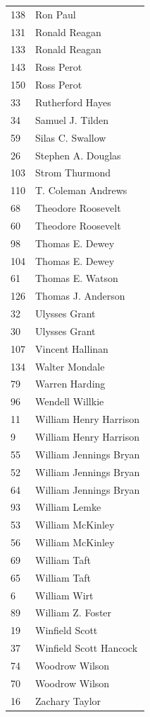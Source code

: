 \documentclass[
  letterpaper,
  DIV=11,
  numbers=noendperiod]{scrreprt}
\begin{document}
\begin{tabular}{ll}
138 &                Ron Paul \\
131 &           Ronald Reagan \\
133 &           Ronald Reagan \\
143 &              Ross Perot \\
150 &              Ross Perot \\
33  &        Rutherford Hayes \\
34  &        Samuel J. Tilden \\
59  &        Silas C. Swallow \\
26  &      Stephen A. Douglas \\
103 &          Strom Thurmond \\
110 &      T. Coleman Andrews \\
68  &      Theodore Roosevelt \\
60  &      Theodore Roosevelt \\
98  &         Thomas E. Dewey \\
104 &         Thomas E. Dewey \\
61  &        Thomas E. Watson \\
126 &      Thomas J. Anderson \\
32  &           Ulysses Grant \\
30  &           Ulysses Grant \\
107 &        Vincent Hallinan \\
134 &          Walter Mondale \\
79  &          Warren Harding \\
96  &         Wendell Willkie \\
11  &  William Henry Harrison \\
9   &  William Henry Harrison \\
55  &  William Jennings Bryan \\
52  &  William Jennings Bryan \\
64  &  William Jennings Bryan \\
93  &           William Lemke \\
53  &        William McKinley \\
56  &        William McKinley \\
69  &            William Taft \\
65  &            William Taft \\
6   &            William Wirt \\
89  &       William Z. Foster \\
19  &          Winfield Scott \\
37  &  Winfield Scott Hancock \\
74  &          Woodrow Wilson \\
70  &          Woodrow Wilson \\
16  &          Zachary Taylor \\
\bottomrule
\end{tabular}
\end{document}
